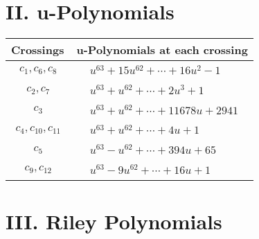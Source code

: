 \documentclass[1p]{elsarticle_modified}
\theoremstyle{definition}
\begin{document}
\newpage\renewcommand{\arraystretch}{1}
\centering \section*{ II. u-Polynomials}
\begin{tabular}{m{50pt}|m{274pt}}
Crossings & \hspace{64pt}u-Polynomials at each crossing \\
\hline $$\begin{aligned}c_{1},c_{6},c_{8}\end{aligned}$$&$\begin{aligned}
&u^{63}+15 u^{62}+\cdots+16 u^2-1
\end{aligned}$\\
\hline $$\begin{aligned}c_{2},c_{7}\end{aligned}$$&$\begin{aligned}
&u^{63}+u^{62}+\cdots+2 u^3+1
\end{aligned}$\\
\hline $$\begin{aligned}c_{3}\end{aligned}$$&$\begin{aligned}
&u^{63}+u^{62}+\cdots+11678 u+2941
\end{aligned}$\\
\hline $$\begin{aligned}c_{4},c_{10},c_{11}\end{aligned}$$&$\begin{aligned}
&u^{63}+u^{62}+\cdots+4 u+1
\end{aligned}$\\
\hline $$\begin{aligned}c_{5}\end{aligned}$$&$\begin{aligned}
&u^{63}- u^{62}+\cdots+394 u+65
\end{aligned}$\\
\hline $$\begin{aligned}c_{9},c_{12}\end{aligned}$$&$\begin{aligned}
&u^{63}-9 u^{62}+\cdots+16 u+1
\end{aligned}$\\
\hline
\end{tabular}\newpage\renewcommand{\arraystretch}{1}
\centering \section*{ III. Riley Polynomials}
\end{document}
